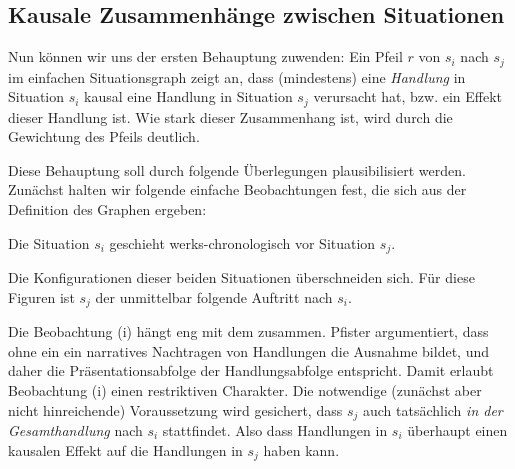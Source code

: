 \documentclass[a4paper,10pt,abstract=true,headings=small]{scrartcl}
\begin{document}
\subsection{Kausale Zusammenhänge zwischen Situationen}



Nun können wir uns der ersten Behauptung zuwenden:
Ein Pfeil $r$ von $s_i$ nach $s_j$ im einfachen Situationsgraph zeigt an, dass (mindestens) eine \emph{Handlung} in Situation $s_i$ kausal eine Handlung in Situation $s_j$ verursacht hat, bzw. ein Effekt dieser Handlung ist.
Wie stark dieser Zusammenhang ist, wird durch die Gewichtung des Pfeils deutlich.

Diese Behauptung soll durch folgende Überlegungen plausibilisiert werden. 
Zunächst halten wir folgende einfache Beobachtungen fest, die sich aus der Definition des Graphen ergeben:
\begin{enumerate*}
    \item Die Situation $s_i$ geschieht werks-chronologisch vor Situation $s_j$. %
    \item Die Konfigurationen dieser beiden Situationen überschneiden sich.
        Für diese Figuren ist $s_j$ der unmittelbar folgende Auftritt nach $s_i$.
\end{enumerate*}

Die Beobachtung (i) hängt eng mit dem  zusammen.
Pfister argumentiert, dass ohne ein  ein narratives Nachtragen von Handlungen die Ausnahme bildet, und daher die Präsentationsabfolge der Handlungsabfolge entspricht.\autocite[Vgl.][273]{pfister_drama:_2001}
Damit erlaubt Beobachtung (i) einen restriktiven Charakter.
Die notwendige (zunächst aber nicht hinreichende) Voraussetzung wird gesichert, dass $s_j$ auch tatsächlich \emph{in der Gesamthandlung} nach $s_i$ stattfindet.
Also dass Handlungen in $s_i$ überhaupt einen kausalen Effekt auf die Handlungen in $s_j$ haben kann.
\end{document}
